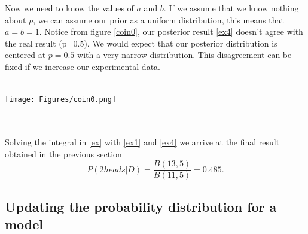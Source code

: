 \documentclass[onecolumn,           %
               showpacs,            %
               preprintnumbers,     %
               aps,                 %
               prl,          	    %
               letterpaper,             %
               superscriptaddress,      %
               nofootinbib,         %
               tightenlines,        %
               floats,floatfix      %
               ,usenatbib,
               ]{revtex4-1}
\begin{document}
Now we need to know the values of $a$ and $b$. If we assume that we know nothing about $p$, we can assume our prior as a uniform distribution, this means that $a=b=1$. 
Notice from figure \ref{coin0}, our posterior result \eqref{ex4} doesn't agree with the real result (p=0.5). We would expect that our posterior distribution is centered at $p=0.5$ with a very narrow distribution. This disagreement can be fixed if we increase our experimental data.\\ $ $\\
\begin{minipage}{\textwidth}
\centering
\texttt{[image: Figures/coin0.png]}
\label{coin0}
\end{minipage}
\\$ $ \\
Solving the integral in \eqref{ex} with \eqref{ex1} and \eqref{ex4} we arrive at the final result obtained in the previous section
\begin{equation}
P(2heads|D)=\frac{B(13,5)}{B(11,5)}=0.485.
\end{equation}
%
%
%
\subsection{Updating the probability distribution for a model} 
\end{document}
